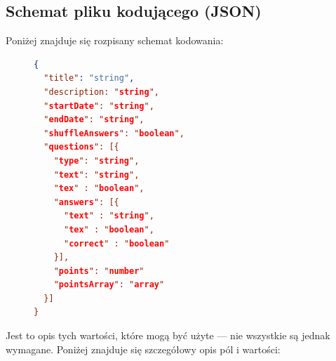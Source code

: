 \subsection{Schemat pliku kodującego (JSON)}
Poniżej znajduje się rozpisany schemat kodowania: 
\begin{figure}[H]
\begin{lstlisting}[language=json,firstnumber=1]
{
  "title": "string",
  "description: "string",
  "startDate": "string",
  "endDate": "string",
  "shuffleAnswers": "boolean",
  "questions": [{
    "type": "string", 
    "text": "string",
    "tex" : "boolean",
    "answers": [{
      "text" : "string",
      "tex" : "boolean",
      "correct" : "boolean"
    }],
    "points": "number"
    "pointsArray": "array"
  }]
}

\end{lstlisting}
\end{figure}
Jest to opis tych wartości, które mogą być użyte --- nie wszystkie są jednak 
wymagane. Poniżej znajduje się szczegółowy opis pól i wartości:
